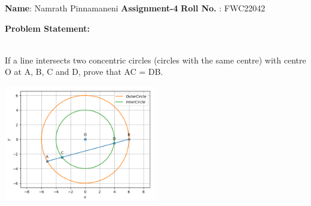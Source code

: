 \documentclass[10pt,a4paper]{report}
\begin{document}
\raggedright \textbf{Name}:\hspace{1mm} Namrath Pinnamaneni\hspace{3cm} \Large \textbf{Assignment-4}\hspace{2.5cm} %
\normalsize \textbf{Roll No.} :\hspace{1mm} FWC22042\vspace{1cm}
\begin{multicols}{2}



\raggedright \textbf{Problem Statement:}\vspace{2mm}
\raggedright \\If a line intersects two concentric circles (circles
with the same centre) with centre O at A, B, C and D, prove that AC = DB.
\vspace{5mm}

\begin{center}
\includegraphics[width=0.5\textwidth]{matrix.png}  
\end{center}\vspace{5mm}
\vspace{2mm}  


\end{multicols}
\end{document}
